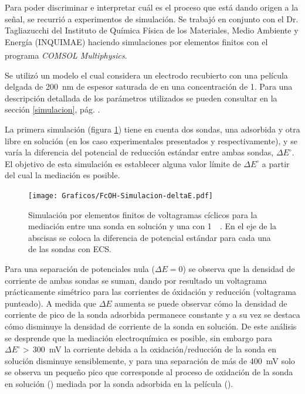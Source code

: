 		Para poder discriminar e interpretar cuál es el proceso que está dando origen a la señal, se recurrió a experimentos de simulación. Se trabajó en conjunto con el Dr. Tagliazucchi del Instituto de Química Física de los Materiales, Medio Ambiente y Energía (INQUIMAE) haciendo simulaciones por elementos finitos con el programa \textit{COMSOL Multiphysics\textsuperscript\textregistered}.

		Se utilizó un modelo el cual considera un electrodo recubierto con una película delgada de \SI{200}{nm} de espesor saturada de  \aminorutenio en una concentración de \SI{1}{\Molar}. Para una descripción detallada de los parámetros utilizados se pueden consultar en la sección \ref{simulacion}, pág. \pageref{simulacion}. 

		La primera simulación (figura \ref{fig:sim_mediacion}) tiene en cuenta dos sondas, una adsorbida y otra libre en solución (en los caso experimentales presentados \ru\space y \fc\space respectivamente), y se varía la diferencia del potencial de reducción estándar entre ambas sondas, $\Delta E^\circ$. El objetivo de esta simulación es establecer alguna valor límite de $\Delta E^\circ$ a partir del cual la mediación es posible. 

			\begin{figure}[th!]
					\centering
					\vspace*{-2mm}
			 	    \texttt{[image: Graficos/FcOH-Simulacion-deltaE.pdf]}
			 	    \vspace*{-3mm}
			        \caption[Simulación EQ de mediación rédox]{Simulación por elementos finitos de voltagramas cíclicos para la mediación entre una sonda en solución y una \pdmF\space con \ru\space \SI{1}{\milli\Molar}. En el eje de la abscisas se coloca la diferencia de potencial estándar para cada una de las sondas con ECS.}
			        \label{fig:sim_mediacion}\vspace*{3mm}
			      	\end{figure}

		Para una separación de potenciales nula ($\Delta E=0$) se observa que la densidad de corriente de ambas sondas se suman, dando por resultado un voltagrama prácticamente simétrico para las corrientes de óxidación y reducción (voltagrama punteado). A medida que $\Delta E$ aumenta se puede observar cómo la densidad de corriente de pico de la sonda adsorbida permanece constante y a su vez se destaca cómo disminuye la densidad de corriente de la sonda en solución. De este análisis se desprende que la mediación electroquímica es posible, sin embargo para $\Delta E^\circ\!\!>\,$\SI{300}{\milli\volt} la corriente debida a la oxidación/reducción de la sonda en solución disminuye sensiblemente, y para una separación de más de \SI{400}{\milli\volt} solo se observa un pequeño pico que corresponde al proceso de oxidación de la sonda en solución (\fc) mediada por la sonda adsorbida en la película (\ru). %

